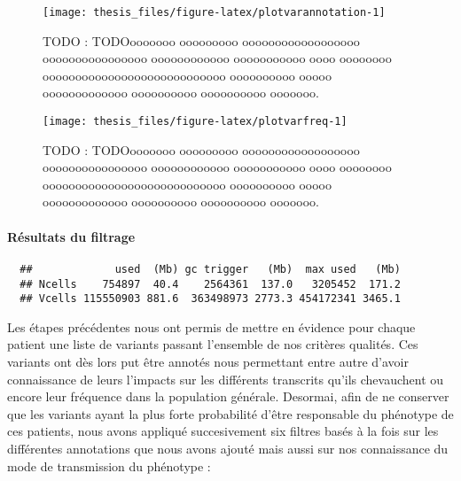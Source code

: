 \documentclass[12pt,twoside]{reedthesis}
\theoremstyle{definition}
\theoremstyle{definition}
\theoremstyle{remark}
\begin{document}
  \begin{figure}
  
  {\centering \texttt{[image: thesis\_files/figure-latex/plotvarannotation-1]} 
  
  }
  
  \caption[TODO]{TODO : TODOooooooo ooooooooo oooooooooooooooooo oooooooooooooooo oooooooooooo ooooooooooo oooo oooooooo oooooooooooooooooooooooooooo oooooooooo ooooo ooooooooooooo oooooooooo oooooooooo ooooooo.}\label{fig:plotvarannotation}
  \end{figure}
  
  \begin{figure}
  
  {\centering \texttt{[image: thesis\_files/figure-latex/plotvarfreq-1]} 
  
  }
  
  \caption[TODO]{TODO : TODOooooooo ooooooooo oooooooooooooooooo oooooooooooooooo oooooooooooo ooooooooooo oooo oooooooo oooooooooooooooooooooooooooo oooooooooo ooooo ooooooooooooo oooooooooo oooooooooo ooooooo.}\label{fig:plotvarfreq}
  \end{figure}
  
  \newpage
  
  \paragraph{Résultats du filtrage}\label{resultats-du-filtrage}
  
  \begin{verbatim}
  ##             used  (Mb) gc trigger   (Mb)  max used   (Mb)
  ## Ncells    754897  40.4    2564361  137.0   3205452  171.2
  ## Vcells 115550903 881.6  363498973 2773.3 454172341 3465.1
  \end{verbatim}
  
  Les étapes précédentes nous ont permis de mettre en évidence pour chaque
  patient une liste de variants passant l'ensemble de nos critères
  qualités. Ces variants ont dès lors put être annotés nous permettant
  entre autre d'avoir connaissance de leurs l'impacts sur les différents
  transcrits qu'ils chevauchent ou encore leur fréquence dans la
  population générale. Desormai, afin de ne conserver que les variants
  ayant la plus forte probabilité d'être responsable du phénotype de ces
  patients, nous avons appliqué succesivement six filtres basés à la fois
  sur les différentes annotations que nous avons ajouté mais aussi sur nos
  connaissance du mode de transmission du phénotype :
  
\end{document}
